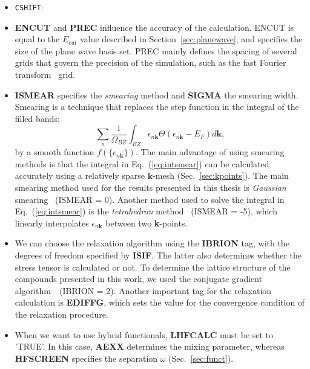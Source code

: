 \begin{refsection}
\begin{itemize}
 \label{appendix:sec-CSHIFT}
\item \texttt{CSHIFT}: 

\item \textbf{ENCUT} and \textbf{PREC} influence the accuracy of the calculation. ENCUT is equal to the $E_{cut}$ value described in Section~\ref{sec:planewave}, and specifies the size of the plane wave basis set.  PREC mainly defines the spacing of several grids that govern the precision of the simulation, such as the fast Fourier transform~\cite{numrec} grid.

\item \textbf{ISMEAR} specifies the \textit{smearing} method and \textbf{SIGMA} the smearing width. Smearing is a technique that replaces the step function in the integral of the filled bands:
\begin{equation}\label{eq:intsmear}
\sum_n \frac{1}{\Omega_{BZ}}\int_{BZ} \epsilon_{n\mathbf{k}} \Theta(\epsilon_{n\mathbf{k}} - E_F) d\mathbf{k},
\end{equation}
by a smooth function $f(\{\epsilon_{n\mathbf{k}}\})$. The main advantage of using smearing methods is that the integral in Eq.~(\ref{eq:intsmear}) can be calculated accurately using a relatively sparse $\mathbf{k}$-mesh (Sec.~\ref{sec:kpoints}). The main smearing method used for the results presented in this thesis is \textit{Gaussian} smearing~\cite{gaussian} (ISMEAR = 0). Another method used to solve the integral in Eq.~(\ref{eq:intsmear}) is the \textit{tetrahedron} method~\cite{tetrahedron} (ISMEAR = -5), which linearly interpolates $\epsilon_{n\mathbf{k}}$ between two \textbf{k}-points.


\item We can choose the relaxation algorithm using the \textbf{IBRION} tag, with the degrees of freedom specified by \textbf{ISIF}. The latter also determines whether the stress tensor is calculated or not. To determine the lattice structure of the compounds presented in this work, we used the conjugate gradient algorithm~\cite{conjgrad}~\cite{iteratieve}(IBRION = 2). Another important tag for the relaxation calculation is \textbf{EDIFFG}, which sets the value for the convergence condition of the relaxation procedure.

\item When we want to use hybrid functionals, \textbf{LHFCALC} must be set to 'TRUE'. In this case, \textbf{AEXX} determines the mixing parameter, whereas \textbf{HFSCREEN} specifies the separation $\omega$ (Sec.~\ref{sec:funct}). 


\end{itemize}
\end{refsection}
